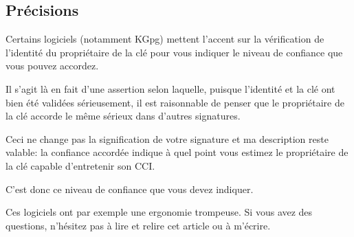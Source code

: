 \subsection{Précisions}\label{pruxe9cisions}

Certains logiciels (notamment KGpg) mettent l'accent sur la vérification
de l'identité du propriétaire de la clé pour vous indiquer le niveau de
confiance que vous pouvez accordez.

Il s'agit là en fait d'une assertion selon laquelle, puisque l'identité
et la clé ont bien été validées sérieusement, il est raisonnable de
penser que le propriétaire de la clé accorde le même sérieux dans
d'autres signatures.

Ceci ne change pas la signification de votre signature et ma description
reste valable: la confiance accordée indique à quel point vous estimez
le propriétaire de la clé capable d'entretenir son CCI.

C'est donc ce niveau de confiance que vous devez indiquer.

Ces logiciels ont par exemple une ergonomie trompeuse. Si vous avez des
questions, n'hésitez pas à lire et relire cet article ou à m'écrire.